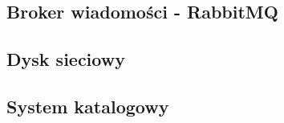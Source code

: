 \documentclass[../../deliverable-two.tex]{subfiles}
\begin{document}
\subsection{Broker wiadomości - RabbitMQ}

\subsection{Dysk sieciowy}

\subsection{System katalogowy}
\end{document}
